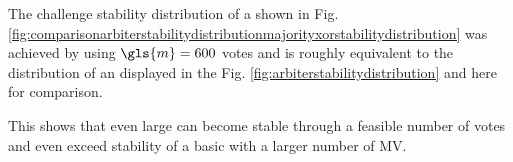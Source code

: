 The challenge stability distribution of a \mxpuf shown in Fig. \ref{fig:comparisonarbiterstabilitydistributionmajorityxorstabilitydistribution} was achieved by using $\gls{m} = 600$ votes and is roughly equivalent to the distribution of an \apuf displayed in the Fig. \ref{fig:arbiterstabilitydistribution} and here for comparison.
\pagebreak

This shows that even large \mxpufs can become stable through a feasible number of votes and even exceed stability of a basic \apuf with a larger number of \ac{MV}.



